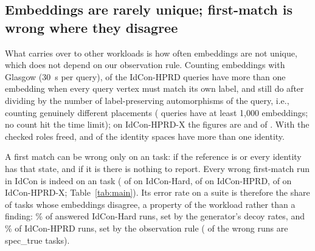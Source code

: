 

\subsection{Embeddings are rarely unique; first-match is wrong where they disagree}
\label{sec:firstmatch}
What carries over to other workloads is how often embeddings are not unique, which does not depend on our observation rule. Counting embeddings with Glasgow (30~s per query), \hprdCountFullMulti{} of the \hprdCountFullQueries{} IdCon-HPRD queries have more than one embedding when every query vertex must match its own label, and \hprdAutoOrbitMulti{} still do after dividing by the number of label-preserving automorphisms of the query, i.e., counting genuinely different placements (\hprdCountFullThousand{} queries have at least 1,000 embeddings; no count hit the time limit); on IdCon-HPRD-X the figures are \hprdxCountFullMulti{} and \hprdxAutoOrbitMulti{} of \hprdxCountFullQueries{}. With the checked roles freed, \hprdCountSpaceMulti{} and \hprdxCountSpaceMulti{} of the identity spaces have more than one identity.

A first match can be wrong only on an \Unk{} task: if the reference is \Sat{} or \Vio{} every identity has that state, and if it is \Emp{} there is nothing to report. Every wrong first-match run in IdCon is indeed on an \Unk{} task (\hardFirstWrongOnUnknown{} of \hardFirstWrong{} on IdCon-Hard, \hprdFirstWrongOnUnknown{} of \hprdFirstWrong{} on IdCon-HPRD, \hprdxFirstWrongOnUnknown{} of \hprdxFirstWrong{} on IdCon-HPRD-X; Table~\ref{tab:main}). Its error rate on a suite is therefore the share of tasks whose embeddings disagree, a property of the workload rather than a finding: \hardFirstWrongAnsweredPct\% of answered IdCon-Hard runs, set by the generator's decoy rates, and \hprdFirstWrongPct\% of IdCon-HPRD runs, set by the observation rule (\hprdFirstWrongSpecTrue{} of the \hprdFirstWrong{} wrong runs are \textsf{spec\_true} tasks).


